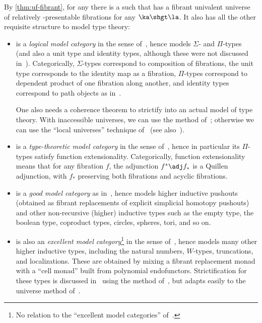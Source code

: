 By \cref{thm:uf-fibrant}, for any \ttmt \E there is a \la such that \E has a fibrant univalent universe of relatively \ka-presentable fibrations for any $\ka\shgt\la$.
It also has all the other requisite structure to model type theory:
\begin{itemize}
\item %
  \E is a \emph{logical model category} in the sense of~\cite{ak:htmtt}, hence models $\Sigma$- and $\Pi$-types (and also a unit type and identity types, although these were not discussed in~\cite{ak:htmtt}).
  Categorically, $\Sigma$-types correspond to composition of fibrations, the unit type corresponds to the identity map as a fibration, $\Pi$-types correspond to dependent product of one fibration along another, and identity types correspond to path objects as in~\cite{aw:htpy-idtype}.

  One also needs a coherence theorem to strictify \E into an actual model of type theory.
  With inaccessible universes, we can use the method of~\cite{klv:ssetmodel}; otherwise we can use the ``local universes'' technique of~\cite{lw:localuniv} (see also~\cite{awodey:natmodels}).
\item %
  \E is a \emph{type-theoretic model category} in the sense of~\cite{shulman:invdia}, hence in particular its $\Pi$-types satisfy function extensionality.
  Categorically, function extensionality means that for any fibration $f$, the adjunction $f^*\adj f_*$ is a Quillen adjunction, with $f_*$ preserving both fibrations and acyclic fibrations.
\item \E is a \emph{good model category} as in~\cite{ls:hits}, hence models higher inductive pushouts (obtained as fibrant replacements of explicit simplicial homotopy pushouts) and other non-recursive (higher) inductive types such as the empty type, the boolean type, coproduct types, circles, spheres, tori, and so on.
\item \E is also an \emph{excellent model category}\footnote{No relation to the ``excellent model categories'' of~\cite[A.3.2.16]{lurie:higher-topoi}.} in the sense of~\cite{ls:hits}, hence models many other higher inductive types, including the natural numbers, $W$-types, truncations, and localizations.
  These are obtained by mixing a fibrant replacement monad with a ``cell monad'' built from polynomial endofunctors.
  Strictification for these types is discussed in~\cite{ls:hits} using the method of~\cite{lw:localuniv}, but adapts easily to the universe method of~\cite{klv:ssetmodel}.
\end{itemize}

